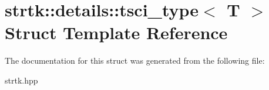 \hypertarget{structstrtk_1_1details_1_1tsci__type}{\section{strtk\-:\-:details\-:\-:tsci\-\_\-type$<$ T $>$ Struct Template Reference}
\label{structstrtk_1_1details_1_1tsci__type}
}


The documentation for this struct was generated from the following file\-:\begin{DoxyCompactItemize}
\item 
strtk.\-hpp\end{DoxyCompactItemize}
